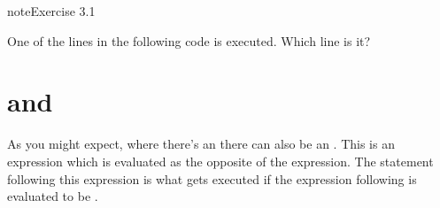 \documentclass[letterpaper,10pt,english]{jupyterBook}
\begin{document}
\begin{sphinxadmonition}{note}{Exercise 3.1}

\sphinxAtStartPar
One of the lines in the following code is  executed. Which line is it?

\begin{sphinxVerbatim}[commandchars=\\\{\}]
   \PYG{p}{[}  \PYG{p}{]}       

                                  


                                  

\end{sphinxVerbatim}
\end{sphinxadmonition}


\section{ and }
\label{\detokenize{notebooks/03_ControlStructures/03_ControlStructures_student:else-and-elif}}
\sphinxAtStartPar
As you might expect, where there’s an  there can also be an . This  is an expression which is evaluated as the opposite of the  expression. The statement following this expression is what gets executed if the expression following  is evaluated to be .
\end{document}
